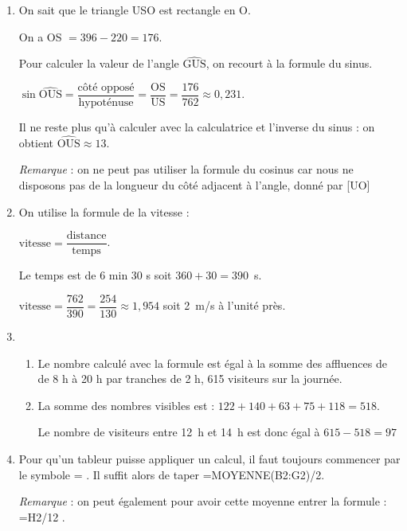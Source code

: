 
\medskip

\begin{enumerate}
\item On sait que le triangle USO est rectangle en O. 

On a OS $ = 396 - 220 = 176$.

Pour calculer la valeur de l'angle $\widehat{\text{GUS}}$, on recourt à
la formule du sinus.

$\sin \widehat{\text{OUS}} = \dfrac{\text{côté opposé}}{\text{hypoténuse}} = \dfrac{\text{OS}}{\text{US}} = \dfrac{176}{762} \approx  0,231$.

Il ne reste plus qu'à calculer avec la calculatrice et l'inverse du sinus : on obtient $\widehat{\text{OUS}} \approx  13$\degres.

\emph{Remarque} : on ne peut pas utiliser la formule du cosinus car nous ne disposons pas de la longueur du côté adjacent à l'angle, donné par [UO]
\item On utilise la formule de la vitesse :

$\text{vitesse} = \dfrac{\text{distance}}{\text{temps}}$.

Le temps est de 6 min 30 s soit $360 + 30 = 390$~s.

$\text{vitesse} = \dfrac{762}{390} = \dfrac{254}{130} \approx 1,954$ soit 2~m/s à l'unité près. 
\item 
	\begin{enumerate}
		\item Le nombre calculé avec la formule est égal à la somme des affluences de de 8 h à 20 h par tranches de 2 h, 615 visiteurs sur la journée.
		\item La somme des nombres visibles est : $122 + 140 + 63 + 75 + 118 = 518$.
		
Le nombre de visiteurs entre 12~h et 14~h est donc égal à $615 - 518 = 97$
	\end{enumerate}
\item Pour qu'un tableur puisse appliquer un calcul, il faut toujours commencer par le symbole \og = \fg. Il suffit alors de taper \og  =MOYENNE(B2:G2)/2\fg.

\emph{Remarque} : on peut également pour avoir cette moyenne entrer la formule : \og =H2/12 \fg.
\end{enumerate}
